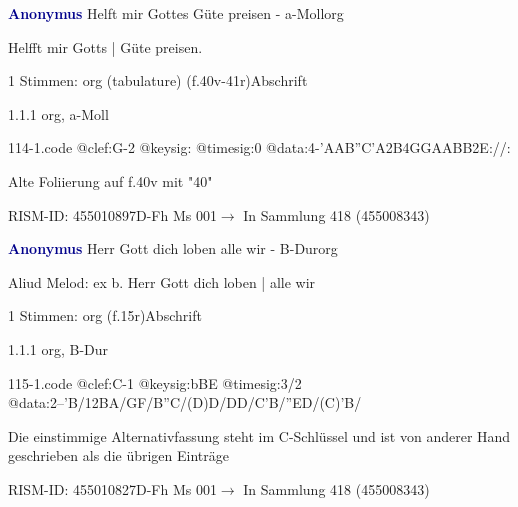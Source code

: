 \documentclass[twocolumn, 12pt]{book}
\begin{document}
\par \vspace{16pt} \textcolor{darkblue}{\textbf{Anonymus  }}\hfillplus{\textbf{[114]}}\newline Helft mir Gottes Güte preisen - a-Moll\newline org
\par \begin{itshape}[f.40v, at left:] Helfft mir Gotts | Güte preisen.\end{itshape} 
\par \textcolor{darkblue}{}  1 Stimmen: org (tabulature)  (f.40v-41r)\newline Abschrift
\par 1.1.1  org, a-Moll  
\begin{filecontents*}{114-1.code}
@clef:G-2
@keysig:
@timesig:0
@data:4-'AAB''C'A2B4GGAABB2E://:
\end{filecontents*}
\newline %
\par Alte Foliierung auf f.40v mit "40"
\par RISM-ID: 455010897\newline D-Fh  Ms 001\newline $\rightarrow$ In Sammlung 418 (455008343)
      
\par \vspace{16pt} \textcolor{darkblue}{\textbf{Anonymus  }}\hfillplus{\textbf{[115]}}\newline Herr Gott dich loben alle wir - B-Dur\newline org
\par \begin{itshape} Aliud Melod: ex b. Herr Gott dich loben | alle wir\end{itshape} 
\par \textcolor{darkblue}{}  1 Stimmen: org  (f.15r)\newline Abschrift
\par 1.1.1  org, B-Dur  
\begin{filecontents*}{115-1.code}
@clef:C-1
@keysig:bBE
@timesig:3/2
@data:2--'B/12BA/GF/B''C/(D)D/DD/C'B/''ED/(C)'B/
\end{filecontents*}
\newline %
\par Die einstimmige Alternativfassung steht im C-Schlüssel und ist von anderer Hand geschrieben als die übrigen Einträge
\par RISM-ID: 455010827\newline D-Fh  Ms 001\newline $\rightarrow$ In Sammlung 418 (455008343)
      
\end{document}
